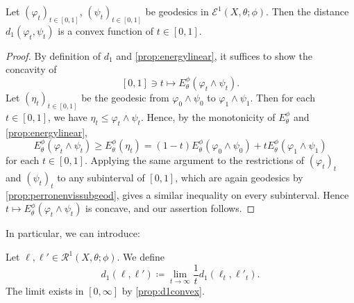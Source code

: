\begin{proposition}\label{prop:d1convex}
    Let $(\varphi_t)_{t\in [0,1]}$, $(\psi_t)_{t\in [0,1]}$ be geodesics in $\mathcal{E}^1(X,\theta;\phi)$. Then the distance $d_1(\varphi_t,\psi_t)$ is a convex function of $t\in [0,1]$.
\end{proposition}
\begin{proof}
    By definition of $d_1$ and \cref{prop:energylinear}, it suffices to show the concavity of
    \[
    [0,1]\ni t\mapsto E_{\theta}^{\phi}(\varphi_t\land \psi_t).
    \]
    Let $(\eta_t)_{t\in [0,1]}$ be the geodesic from $\varphi_0\land \psi_0$ to $\varphi_1\land \psi_1$. Then for each $t\in [0,1]$, we have $\eta_t\leq \varphi_t\land \psi_t$. Hence, by the monotonicity of $E_\theta^\phi$ and \cref{prop:energylinear},
    \[
    E_{\theta}^{\phi}( \varphi_t\land \psi_t)\geq E_{\theta}^{\phi}(\eta_t)=(1-t)E_{\theta}^{\phi}(\varphi_0\land \psi_0)+tE_{\theta}^{\phi}(\varphi_1\land \psi_1)
    \]
    for each $t\in [0,1]$. Applying the same argument to the restrictions of $(\varphi_t)_t$ and $(\psi_t)_t$ to any subinterval of $[0,1]$, which are again geodesics by \cref{prop:perronenvissubgeod}, gives a similar inequality on every subinterval. Hence $t\mapsto E_\theta^\phi(\varphi_t\land\psi_t)$ is concave, and our assertion follows.
\end{proof}

In particular, we can introduce:
\begin{definition}\label{def:d1rays}
    Let $\ell,\ell'\in \mathcal{R}^1(X,\theta;\phi)$. We define
    \[
        d_1(\ell,\ell')\coloneqq \lim_{t\to\infty}\frac{1}{t}d_1(\ell_t,\ell'_t).
    \]
    The limit exists in $[0,\infty]$ by \cref{prop:d1convex}.
\end{definition}

